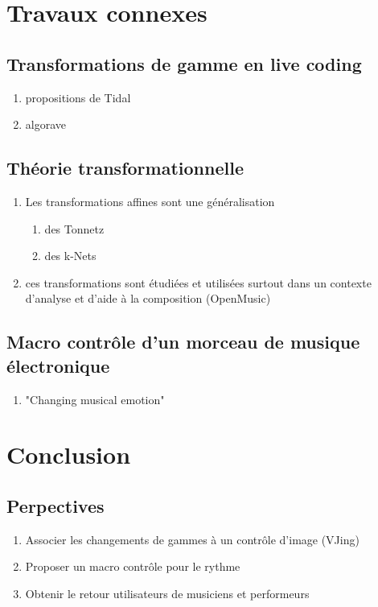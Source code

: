 \documentclass[french,11pt]{article}
\begin{document}
\section{Travaux connexes}
\subsection{Transformations de gamme en live coding}
\begin{enumerate}
  \item propositions de Tidal
  \item algorave
\end{enumerate}
\subsection{Théorie transformationnelle}
\begin{enumerate}
  \item Les transformations affines sont une généralisation 
  \begin{enumerate}
    \item des Tonnetz
    \item des k-Nets
  \end{enumerate}
  \item ces transformations sont étudiées et utilisées surtout dans un contexte d'analyse et d'aide à la composition (OpenMusic)
\end{enumerate}

\subsection{Macro contrôle d'un morceau de musique électronique}
\begin{enumerate}
  \item "Changing musical emotion"
\end{enumerate}

\section{Conclusion}
\subsection{Perpectives}
\begin{enumerate}
  \item Associer les changements de gammes à un contrôle d'image (VJing)
  \item Proposer un macro contrôle pour le rythme
  \item Obtenir le retour utilisateurs de musiciens et performeurs
\end{enumerate}
\newpage
\printbibliography
\end{document}

